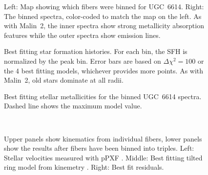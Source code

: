 \documentclass{emulateapj}
\begin{document}
\begin{figure}
\caption{Left:  Map showing which fibers were binned for UGC~6614.  Right:  The binned spectra, color-coded to match the map on the left.  As with Malin~2, the inner spectra show strong metallicity absorption features while the outer spectra show emission lines. \label{ugc_binmap}}
\end{figure}




\begin{figure}
\caption{Best fitting star formation histories.  For each bin, the SFH is normalized by the peak bin.  Error bars are based on $\Delta\chi^2=100$ or the 4 best fitting models, whichever provides more points.  As with Malin~2, old stars dominate at all radii.  \label{sfh_ugc} }
\end{figure}


\begin{figure}
\caption{Best fitting stellar metallicities for the binned UGC~6614 spectra.  Dashed line shows the maximum model value.  \label{metal_ugc}}
\end{figure}


\begin{figure*}
 \\
\caption{Upper panels show kinematics from individual fibers, lower panels show the results after fibers have been binned into triples.  Left:  Stellar velocities measured with pPXF \citep{Cappellari04}. Middle:  Best fitting tilted ring model from kinemetry \citep{Krajn06}. Right: Best fit residuals.  \label{ugc_kinem_fibers}}
\end{figure*}
\end{document}
